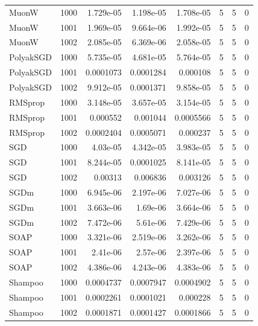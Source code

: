 \begin{tabular}{lrrrrrrr}
MuonW & 1000 & 1.729e-05 & 1.198e-05 & 1.708e-05 & 5 & 5 & 0 \\
MuonW & 1001 & 1.969e-05 & 9.664e-06 & 1.992e-05 & 5 & 5 & 0 \\
MuonW & 1002 & 2.085e-05 & 6.369e-06 & 2.058e-05 & 5 & 5 & 0 \\
PolyakSGD & 1000 & 5.735e-05 & 4.681e-05 & 5.764e-05 & 5 & 5 & 0 \\
PolyakSGD & 1001 & 0.0001073 & 0.0001284 & 0.000108 & 5 & 5 & 0 \\
PolyakSGD & 1002 & 9.912e-05 & 0.0001371 & 9.858e-05 & 5 & 5 & 0 \\
RMSprop & 1000 & 3.148e-05 & 3.657e-05 & 3.154e-05 & 5 & 5 & 0 \\
RMSprop & 1001 & 0.000552 & 0.001044 & 0.0005566 & 5 & 5 & 0 \\
RMSprop & 1002 & 0.0002404 & 0.0005071 & 0.000237 & 5 & 5 & 0 \\
SGD & 1000 & 4.03e-05 & 4.342e-05 & 3.983e-05 & 5 & 5 & 0 \\
SGD & 1001 & 8.244e-05 & 0.0001025 & 8.141e-05 & 5 & 5 & 0 \\
SGD & 1002 & 0.00313 & 0.006836 & 0.003126 & 5 & 5 & 0 \\
SGDm & 1000 & 6.945e-06 & 2.197e-06 & 7.027e-06 & 5 & 5 & 0 \\
SGDm & 1001 & 3.663e-06 & 1.69e-06 & 3.664e-06 & 5 & 5 & 0 \\
SGDm & 1002 & 7.472e-06 & 5.61e-06 & 7.429e-06 & 5 & 5 & 0 \\
SOAP & 1000 & 3.321e-06 & 2.519e-06 & 3.262e-06 & 5 & 5 & 0 \\
SOAP & 1001 & 2.41e-06 & 2.57e-06 & 2.397e-06 & 5 & 5 & 0 \\
SOAP & 1002 & 4.386e-06 & 4.243e-06 & 4.383e-06 & 5 & 5 & 0 \\
Shampoo & 1000 & 0.0004737 & 0.0007947 & 0.0004902 & 5 & 5 & 0 \\
Shampoo & 1001 & 0.0002261 & 0.0001021 & 0.000228 & 5 & 5 & 0 \\
Shampoo & 1002 & 0.0001871 & 0.0001427 & 0.0001866 & 5 & 5 & 0 \\
\bottomrule
\end{tabular}
